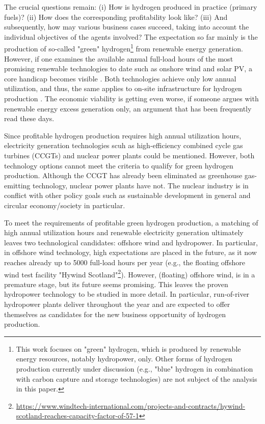 \documentclass[review]{elsarticle}
\begin{document}
The crucial questions remain: (i) How is hydrogen produced in practice (primary fuels)? (ii) How does the corresponding profitability look like? (iii) And subsequently, how may various business cases succeed, taking into account the individual objectives of the agents involved? The expectation so far mainly is the production of so-called "green" hydrogen\footnote{This work focuses on "green" hydrogen, which is produced by renewable energy resources, notably hydropower, only. Other forms of hydrogen production currently under discussion (e.g., "blue" hydrogen in combination with carbon capture and storage technologies) are not subject of the analysis in this paper.} from renewable energy generation. However, if one examines the available annual full-load hours of the most promising renewable technologies to date such as onshore wind and solar PV, a core handicap becomes visible \cite{ajanovic2018economic}. Both technologies achieve only low annual utilization, and thus, the same applies to on-site infrastructure for hydrogen production \cite{ball2015hydrogen}. The economic viability is getting even worse, if someone argues with renewable energy excess generation only, an argument that has been frequently read these days.\vspace{0.3cm}

Since profitable hydrogen production requires high annual utilization hours, electricity generation technologies scuh as high-efficiency combined cycle gas turbines (CCGTs) and nuclear power plants could be mentioned. However, both technology options cannot meet the criteria to qualify for green hydrogen production. Although the CCGT has already been eliminated as greenhouse gas-emitting technology, nuclear power plants have not. The nuclear industry is in conflict with other policy goals such as sustainable development in general and circular economy/society in particular.\vspace{0.3cm}

To meet the requirements of profitable green hydrogen production, a matching of high annual utilization hours and renewable electricity generation ultimately leaves two technological candidates: offshore wind and hydropower. In particular, in offshore wind technology, high expectations are placed in the future, as it now reaches already up to \SI{5000}{} full-load hours per year (e.g., the floating offshore wind test facility "Hywind Scotland"\footnote{\url{https://www.windtech-international.com/projects-and-contracts/hywind-scotland-reaches-capacity-factor-of-57-1}}). However, (floating) offshore wind, is in a premature stage, but its future seems promising. This leaves the proven hydropower technology to be studied in more detail. In particular, run-of-river hydropower plants deliver throughout the year and are expected to offer themselves as candidates for the new business opportunity of hydrogen production.\vspace{0.3cm}
\end{document}
